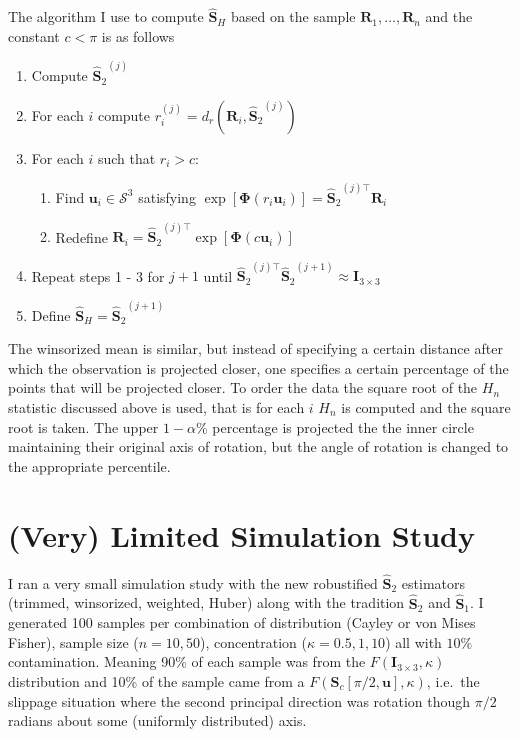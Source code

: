 \documentclass{article}\usepackage[]{graphicx}\usepackage[]{color}
\newcommand{\ProjMean}{{\widehat{\bm S}_{2}}}
\newcommand{\ProjMedian}{{\widehat{\bm S}_{1}}}
\newcommand{\HuberMean}{{\widehat{\bm S}_H}}
\begin{document}
The algorithm I use to compute $\HuberMean$ based on the sample $\bm R_1,\dots,\bm R_n$ and the constant $c<\pi$ is as follows
\begin{enumerate} 
\item Compute $\ProjMean^{(j)}$
\item For each $i$ compute $r_i^{(j)}=d_r(\bm R_i,\ProjMean^{(j)})$
\item For each $i$ such that $r_i>c$:
\begin{enumerate}
\item Find $\bm u_i\in\mathcal{S}^3$ satisfying $\exp[\bm{\Phi}(r_i\bm u_i)]=\ProjMean^{(j)\top}\bm R_i$
\item Redefine $\bm R_i=\ProjMean^{(j)\top}\exp[\bm{\Phi}(c\bm u_i)]$
\end{enumerate}
\item Repeat steps 1 - 3 for $j+1$ until $\ProjMean^{(j)\top}\ProjMean^{(j+1)}\approx \bm{I}_{3\times 3}$
\item Define $\HuberMean=\ProjMean^{(j+1)}$
\end{enumerate}

The winsorized mean is similar, but instead of specifying a certain distance after which the observation is projected closer, one specifies a certain percentage of the points that will be projected closer.  To order the data the square root of the $H_n$ statistic discussed above is used, that is for each $i$ $H_n$ is computed and the square root is taken.  The upper $1-\alpha$\% percentage is projected the the inner circle maintaining their original axis of rotation, but the angle of rotation is changed to the appropriate percentile.

% 








\section{(Very) Limited Simulation Study}

I ran a very small simulation study with the new robustified $\ProjMean$ estimators (trimmed, winsorized, weighted, Huber) along with the tradition $\ProjMean$ and $\ProjMedian$.  I generated 100 samples per combination of distribution (Cayley or von Mises Fisher), sample size ($n=10,50$), concentration ($\kappa=0.5,1,10$) all with $10\%$ contamination.  Meaning 90\% of each sample was from the $F(\bm I_{3\times 3},\kappa)$ distribution and 10\% of the sample came from a $F(\bm S_c[\pi/2,\bm u],\kappa)$, i.e.~the slippage situation where the second principal direction was rotation though $\pi/2$ radians about some (uniformly distributed) axis.
\end{document}

